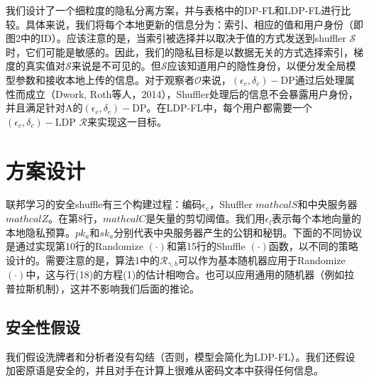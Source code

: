 我们设计了一个细粒度的隐私分离方案，并与表格中的DP-FL和LDP-FL进行比较。具体来说，我们将每个本地更新的信息分为：索引、相应的值和用户身份（即图2中的ID）。应该注意的是，当索引被选择并以取决于值的方式发送到shuffler $\mathcal{S}$时，它们可能是敏感的。因此，我们的隐私目标是以数据无关的方式选择索引，梯度的真实值对$\mathcal{S}$来说是不可见的。但$\mathcal{S}$应该知道用户的隐性身份，以便分发全局模型参数和接收本地上传的信息。对于观察者$\mathcal{O}$来说，$\left(\epsilon_{c}, \delta_{c}\right)-\mathrm{DP}$通过后处理属性而成立（Dwork, Roth等人，2014），Shuffler处理后的信息不会暴露用户身份，并且满足针对A的$\left(\epsilon_{c}, \delta_{c}\right)-\mathrm{DP}$。在LDP-FL中，每个用户都需要一个$\left(\epsilon_{c}, \delta_{c}\right)-\mathrm{LDP}$ $\mathcal{R}$来实现这一目标。

\section{方案设计}
联邦学习的安全shuffle有三个构建过程：编码$\epsilon_{c}$，Shuffler $mathcal{S}$和中央服务器 $mathcal{Z}$。在第8行，$mathcal{C}$是矢量的剪切阈值。我们用$\epsilon_{l}$表示每个本地向量的本地隐私预算。$p k_{a}$和$s k_{a}$分别代表中央服务器产生的公钥和秘钥。下面的不同协议是通过实现第10行的Randomize $(\cdot)$和第15行的Shuffle $(\cdot)$函数，以不同的策略设计的。需要注意的是，算法1中的$\mathcal{R}_{\gamma, b}$可以作为基本随机器应用于Randomize $(\cdot)$中，这与行(18)的方程(1)的估计相吻合。也可以应用通用的随机器（例如拉普拉斯机制），这并不影响我们后面的推论。

\subsection{安全性假设}
我们假设洗牌者和分析者没有勾结（否则，模型会简化为LDP-FL）。我们还假设加密原语是安全的，并且对手在计算上很难从密码文本中获得任何信息。

